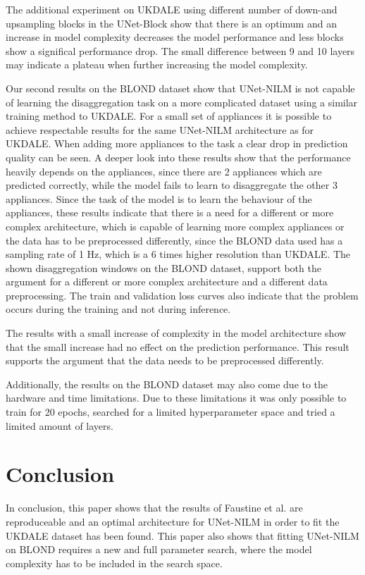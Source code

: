 \documentclass[sigconf]{acmart}
\begin{document}
The additional experiment on UKDALE using different number of down-and upsampling blocks in the UNet-Block show that there
is an optimum and an increase in model complexity decreases the model performance and less blocks show a significal 
performance drop. The small difference between 9 and 10 layers may indicate a plateau when further increasing the model complexity.

Our second results on the BLOND dataset show that UNet-NILM is not capable of learning the disaggregation task on a more complicated 
dataset using a similar training method to UKDALE. 
For a small set of appliances it is possible to achieve respectable results for the same UNet-NILM architecture as for UKDALE.
When adding more appliances to the task a clear drop in prediction quality can be seen. A deeper look into these results show that the
performance heavily depends on the appliances, since there are 2 appliances which are predicted correctly, while the model fails to learn to 
disaggregate the other 3 appliances.
Since the task of the model is to learn the behaviour of the appliances, these results indicate that there is a need for a different or more 
complex architecture, which is capable of learning more complex appliances or the data has to be preprocessed differently, since the BLOND data 
used has a sampling rate of 1 Hz, which is a 6 times higher resolution than UKDALE. 
The shown disaggregation windows on the BLOND dataset, support both the argument for a different or more complex architecture and a different 
data preprocessing. The train and validation loss curves also indicate that the problem occurs during the training and not during inference.

The results with a small increase of complexity in the model architecture show that the small increase had no effect on the prediction 
performance. This result supports the argument that the data needs to be preprocessed differently.

Additionally, the results on the BLOND dataset may also come due to the hardware and time limitations. Due to these limitations it was only possible 
to train for 20 epochs, searched for a limited hyperparameter space and tried a limited amount of layers. 

\section{Conclusion}\label{chapter:conclusion}
In conclusion, this paper shows that the results of Faustine et al. are reproduceable and an optimal architecture 
for UNet-NILM in order to fit the UKDALE dataset has been found. This paper also shows that fitting UNet-NILM on BLOND requires a new and full parameter 
search, where the model complexity has to be included in the search space. 
\end{document}
